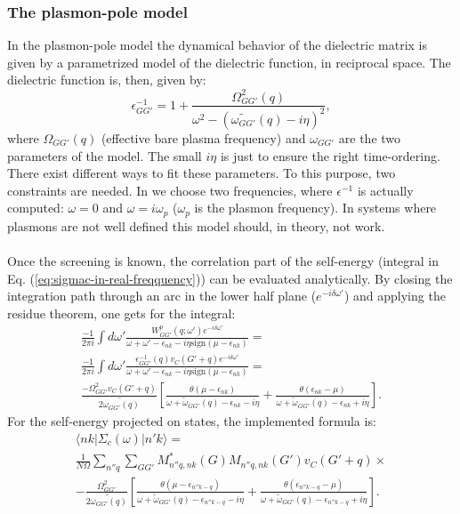 \documentclass[11pt]{article}
\begin{document}
\subsubsection{The plasmon-pole model} \label{plasmon-pole}
In the plasmon-pole model the dynamical behavior of the dielectric matrix is given
by a parametrized model of the dielectric function, in reciprocal space. The dielectric function is, then, given by:
\begin{equation}
\epsilon^{-1}_{GG'}=1+\frac {\Omega^2_{GG'}(q)}{\omega^2-(\tilde{\omega_{GG'}}(q)-i\eta)^2},
\end{equation}
where $\Omega_{GG'}(q)$ (effective bare plasma frequency) and $\omega_{GG'}$ are the two parameters of the model. 
The small $i\eta$ is just to ensure the right time-ordering. There exist different ways to fit these parameters. To 
this purpose, two constraints are needed. In \SAX we choose two frequencies, where $\epsilon^{-1}$ is actually computed:
$\omega=0$ and $\omega=i\omega_p$ ($\omega_p$ is the plasmon frequency). In systems where plasmons are not well defined
this model should, in theory, not work.
\\
\\
Once the screening is known, the correlation part of the self-energy (integral in Eq. (\ref{eq:sigmac-in-real-freqquency})) can
be evaluated analytically. By closing the integration path through an arc in the lower 
half plane ($e^{-i\delta\omega'}$) and applying the residue
theorem, one gets for the integral:
\begin{multline}
\frac{-1}{2\pi i}\int d\omega'\frac{W^p_{GG'}(q;\omega')e^{-i\delta\omega'}}{
\omega + \omega' - \epsilon_{nk} - i\eta\text{sign}(\mu-\epsilon_{nk})} =\\
\frac{-1}{2\pi i}\int d\omega'\frac{\epsilon^{-1}_{GG'}(q)v_C(G'+q)e^{-i\delta\omega'}}{
\omega + \omega' - \epsilon_{nk} - i\eta\text{sign}(\mu-\epsilon_{nk})}=\\
\frac{-\Omega^2_{GG'}v_C(G'+q)}{2\tilde{\omega_{GG'}(q)}}[\frac{\theta(\mu-\epsilon_{nk})}{\omega+\tilde{\omega}_{GG'}(q)-\epsilon_{nk}-i\eta}+
\frac{\theta(\epsilon_{nk}-\mu)}{\omega+\tilde{\omega}_{GG'}(q)-\epsilon_{nk}+i\eta}]. 
\end{multline}
For the self-energy projected on states, the implemented formula is:
\begin{multline}
\langle nk | \Sigma_c(\omega) | n'k \rangle
=\\
\frac{1}{N\Omega} \sum_{n''q} \sum_{GG'}
M^*_{n''q,nk}(G) M_{n''q,nk}(G')v_C(G'+q)
\times \\
-\frac{\Omega^2_{GG'}}{2\tilde{\omega_{GG'}(q)}}[\frac{\theta(\mu-\epsilon_{n''k-q})}{\omega+\tilde{\omega}_{GG'}(q)-\epsilon_{n''k-q}-i\eta}+
\frac{\theta(\epsilon_{n''k-q}-\mu)}{\omega+\tilde{\omega}_{GG'}(q)-\epsilon_{n''k-q}+i\eta}].
\end{multline}
\end{document}
